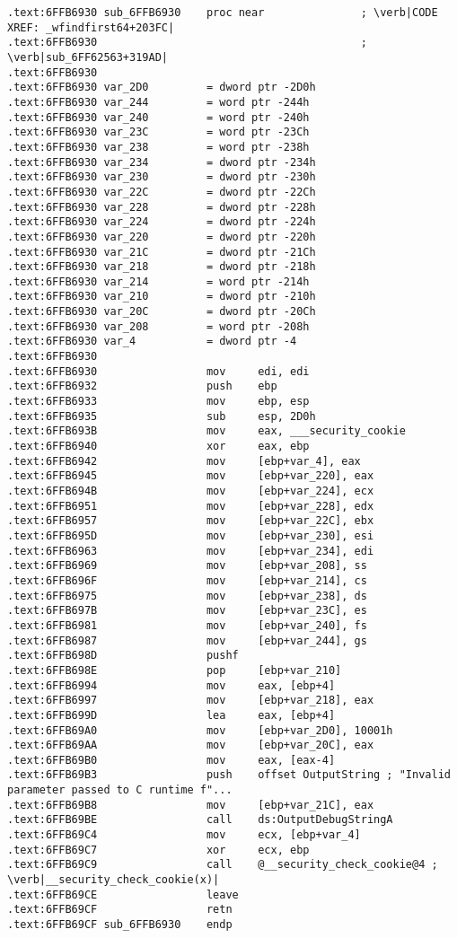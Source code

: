 \begin{lstlisting}[style=customasmx86,label=msvcrt_output]
.text:6FFB6930 sub_6FFB6930    proc near               ; \verb|CODE XREF: _wfindfirst64+203FC|
.text:6FFB6930                                         ; \verb|sub_6FF62563+319AD|
.text:6FFB6930
.text:6FFB6930 var_2D0         = dword ptr -2D0h
.text:6FFB6930 var_244         = word ptr -244h
.text:6FFB6930 var_240         = word ptr -240h
.text:6FFB6930 var_23C         = word ptr -23Ch
.text:6FFB6930 var_238         = word ptr -238h
.text:6FFB6930 var_234         = dword ptr -234h
.text:6FFB6930 var_230         = dword ptr -230h
.text:6FFB6930 var_22C         = dword ptr -22Ch
.text:6FFB6930 var_228         = dword ptr -228h
.text:6FFB6930 var_224         = dword ptr -224h
.text:6FFB6930 var_220         = dword ptr -220h
.text:6FFB6930 var_21C         = dword ptr -21Ch
.text:6FFB6930 var_218         = dword ptr -218h
.text:6FFB6930 var_214         = word ptr -214h
.text:6FFB6930 var_210         = dword ptr -210h
.text:6FFB6930 var_20C         = dword ptr -20Ch
.text:6FFB6930 var_208         = word ptr -208h
.text:6FFB6930 var_4           = dword ptr -4
.text:6FFB6930
.text:6FFB6930                 mov     edi, edi
.text:6FFB6932                 push    ebp
.text:6FFB6933                 mov     ebp, esp
.text:6FFB6935                 sub     esp, 2D0h
.text:6FFB693B                 mov     eax, ___security_cookie
.text:6FFB6940                 xor     eax, ebp
.text:6FFB6942                 mov     [ebp+var_4], eax
.text:6FFB6945                 mov     [ebp+var_220], eax
.text:6FFB694B                 mov     [ebp+var_224], ecx
.text:6FFB6951                 mov     [ebp+var_228], edx
.text:6FFB6957                 mov     [ebp+var_22C], ebx
.text:6FFB695D                 mov     [ebp+var_230], esi
.text:6FFB6963                 mov     [ebp+var_234], edi
.text:6FFB6969                 mov     [ebp+var_208], ss
.text:6FFB696F                 mov     [ebp+var_214], cs
.text:6FFB6975                 mov     [ebp+var_238], ds
.text:6FFB697B                 mov     [ebp+var_23C], es
.text:6FFB6981                 mov     [ebp+var_240], fs
.text:6FFB6987                 mov     [ebp+var_244], gs
.text:6FFB698D                 pushf
.text:6FFB698E                 pop     [ebp+var_210]
.text:6FFB6994                 mov     eax, [ebp+4]
.text:6FFB6997                 mov     [ebp+var_218], eax
.text:6FFB699D                 lea     eax, [ebp+4]
.text:6FFB69A0                 mov     [ebp+var_2D0], 10001h
.text:6FFB69AA                 mov     [ebp+var_20C], eax
.text:6FFB69B0                 mov     eax, [eax-4]
.text:6FFB69B3                 push    offset OutputString ; "Invalid parameter passed to C runtime f"...
.text:6FFB69B8                 mov     [ebp+var_21C], eax
.text:6FFB69BE                 call    ds:OutputDebugStringA
.text:6FFB69C4                 mov     ecx, [ebp+var_4]
.text:6FFB69C7                 xor     ecx, ebp
.text:6FFB69C9                 call    @__security_check_cookie@4 ; \verb|__security_check_cookie(x)|
.text:6FFB69CE                 leave
.text:6FFB69CF                 retn
.text:6FFB69CF sub_6FFB6930    endp
\end{lstlisting}

